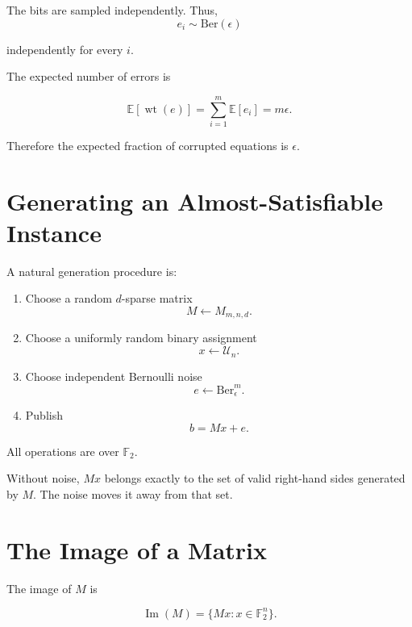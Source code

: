 \documentclass[11pt,a4paper]{article}
\newcommand{\F}{\mathbb{F}}
\newcommand{\wt}{\operatorname{wt}}
\newcommand{\Image}{\operatorname{Im}}
\newcommand{\Ber}{\mathrm{Ber}}
\newcommand{\U}{\mathcal{U}}
\newcommand{\E}{\mathbb{E}}
\begin{document}
The bits are sampled independently.
Thus, \begin{equation}
    e_i\sim\Ber(\epsilon)
\end{equation}

independently for every $i$.

The expected number of errors is

\begin{equation}
    \E[\wt(e)]
    =
    \sum_{i=1}^m\E[e_i]
    =
    m\epsilon.
\end{equation}

Therefore the expected fraction of corrupted equations is $\epsilon$.

\section{Generating an Almost-Satisfiable Instance}

A natural generation procedure is:

\begin{enumerate}
    \item Choose a random $d$-sparse matrix
    \[
        M\leftarrow M_{m,n,d}.
    \]

    \item Choose a uniformly random binary assignment
    \[
        x\leftarrow \U_n.
    \]

    \item Choose independent Bernoulli noise
    \[
        e\leftarrow\Ber_\epsilon^m.
    \]

    \item Publish
    \[
        \boxed{b=Mx+e}.
    \]
\end{enumerate}

All operations are over $\F_2$.

Without noise, $Mx$ belongs exactly to the set of valid right-hand
sides generated by $M$. The noise moves it away from that set.

\section{The Image of a Matrix}

The image of $M$ is

\begin{equation}
    \Image(M)
    =
    \{Mx:x\in\F_2^n\}.
\end{equation}
\end{document}
